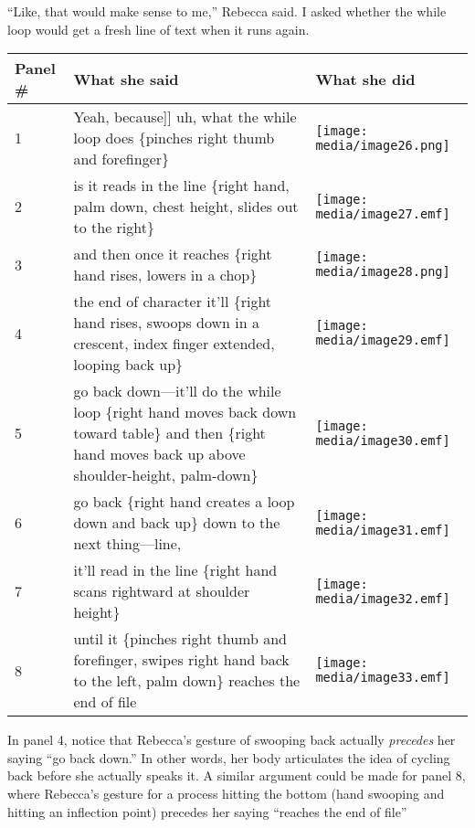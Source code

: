 ``Like, that would make sense to me,'' Rebecca said. I asked whether the
while loop would get a fresh line of text when it runs again.

\begin{longtable}[]{@{}lll@{}}
\toprule
Panel \# & What she said & What she did\tabularnewline
\midrule
\endhead
1 & Yeah, because{]}{]} uh, \textbar{}\textbar{}what the while loop
does\textbar{}\textbar{} \textbar{}\{pinches right thumb and
forefinger\}\textbar{} &
\texttt{[image: media/image26.png]}\tabularnewline
2 & \textbar{}\textbar{}is it reads in the line\textbar{}\textbar{}
\textbar{}\{right hand, palm down, chest height, slides out to the
right\}\textbar{} &
\texttt{[image: media/image27.emf]}\tabularnewline
3 & and then \textbar{}\textbar{}once it reaches\textbar{}\textbar{}
\textbar{}\{right hand rises, lowers in a chop\}\textbar{} &
\texttt{[image: media/image28.png]}\tabularnewline
4 & the end of \textbar{}\textbar{}character it'll\textbar{}\textbar{}
\textbar{}\{right hand rises, swoops down in a crescent, index finger
extended, looping back up\}\textbar{} &
\texttt{[image: media/image29.emf]}\tabularnewline
5 & go back down---it'll \textbar{}\textbar{}do the while
loop\textbar{}\textbar{} \textbar{}\{right hand moves back down toward
table\}\textbar{} \textbar{}\textbar{}and then\textbar{}\textbar{}
\textbar{}\{right hand moves back up above shoulder-height,
palm-down\}\textbar{} &
\texttt{[image: media/image30.emf]}\tabularnewline
6 & \textbar{}\textbar{}go back\textbar{}\textbar{} \textbar{}\{right
hand creates a loop down and back up\}\textbar{} down to the next
thing---line, &
\texttt{[image: media/image31.emf]}\tabularnewline
7 & it'll \textbar{}\textbar{}read in the line\textbar{}\textbar{}
\textbar{}\{right hand scans rightward at shoulder height\}\textbar{} &
\texttt{[image: media/image32.emf]}\tabularnewline
8 & \textbar{}\textbar{}until it\textbar{}\textbar{} \textbar{}\{pinches
right thumb and forefinger, swipes right hand back to the left, palm
down\}\textbar{} reaches the end of file &
\texttt{[image: media/image33.emf]}\tabularnewline
\bottomrule
\end{longtable}

In panel 4, notice that Rebecca's gesture of swooping back actually
\emph{precedes} her saying ``go back down.'' In other words, her body
articulates the idea of cycling back before she actually speaks it. A
similar argument could be made for panel 8, where Rebecca's gesture for
a process hitting the bottom (hand swooping and hitting an inflection
point) precedes her saying ``reaches the end of file''

